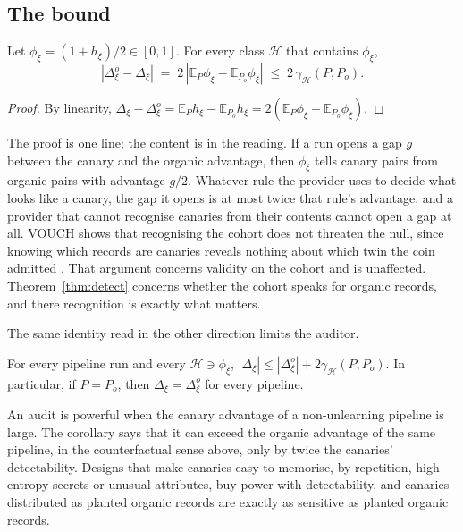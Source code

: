 \subsection{The bound}

\begin{theorem}\label{thm:detect}
Let $\phi_\xi=(1+h_\xi)/2\in[0,1]$. For every class $\mathcal H$ that contains $\phi_\xi$,
\[
|\Delta^o_\xi-\Delta_\xi|\;=\;2\,|\mathbb{E}_P\phi_\xi-\mathbb{E}_{P_o}\phi_\xi|
\;\le\;2\,\gamma_{\mathcal H}(P,P_o).
\]
\end{theorem}

\begin{proof}
By linearity, $\Delta_\xi-\Delta^o_\xi=\mathbb{E}_Ph_\xi-\mathbb{E}_{P_o}h_\xi
=2(\mathbb{E}_P\phi_\xi-\mathbb{E}_{P_o}\phi_\xi)$.
\end{proof}

The proof is one line; the content is in the reading. If a run opens a gap $g$ between the
canary and the organic advantage, then $\phi_\xi$ tells canary pairs from organic pairs with
advantage $g/2$. Whatever rule the provider uses to decide what looks like a canary, the gap
it opens is at most twice that rule's advantage, and a provider that cannot recognise
canaries from their contents cannot open a gap at all. VOUCH shows that recognising the
cohort does not threaten the null, since knowing which records are canaries reveals nothing
about which twin the coin admitted \citep{dang2026vouch}. That argument concerns validity on
the cohort and is unaffected. Theorem~\ref{thm:detect} concerns whether the cohort speaks for
organic records, and there recognition is exactly what matters.

The same identity read in the other direction limits the auditor.

\begin{corollary}\label{cor:tradeoff}
For every pipeline run and every $\mathcal H\ni\phi_\xi$,
$|\Delta_\xi|\le|\Delta^o_\xi|+2\gamma_{\mathcal H}(P,P_o)$. In particular, if $P=P_o$, then
$\Delta_\xi=\Delta^o_\xi$ for every pipeline.
\end{corollary}

An audit is powerful when the canary advantage of a non-unlearning pipeline is large. The
corollary says that it can exceed the organic advantage of the same pipeline, in the
counterfactual sense above, only by twice the canaries' detectability. Designs that make
canaries easy to memorise, by repetition, high-entropy secrets or unusual attributes, buy
power with detectability, and canaries distributed as planted organic records are exactly as
sensitive as planted organic records.

